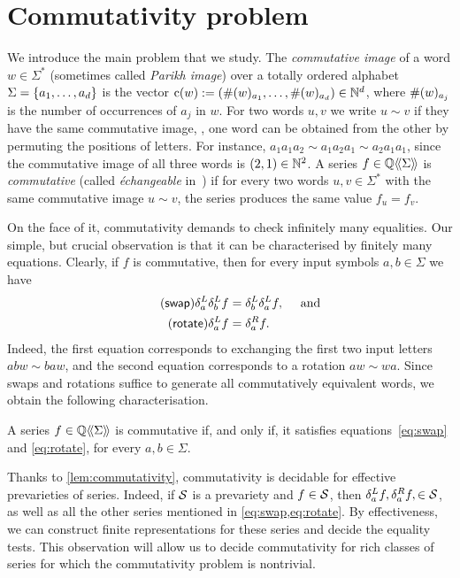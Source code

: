 \section{Commutativity problem}
\label{sec:commutativity}

We introduce the main problem that we study.
%
The \emph{commutative image} of a word $w \in \Sigma^*$ (sometimes called \emph{Parikh image})
over a totally ordered alphabet $\Sigma = \set{a_1, \dots, a_d}$
is the vector $\Parikh w := \tuple{\multiplicity {a_1} w, \dots, \multiplicity {a_d} w} \in \N^d$,
where $\multiplicity {a_j} w$ is the number of occurrences of $a_j$ in $w$.
%
For two words $u, v$ we write $u \sim v$ if they have the same commutative image,
\ie, one word can be obtained from the other by permuting the positions of letters.
%
For instance, $a_1a_1a_2 \sim a_1a_2a_1 \sim a_2a_1a_1$,
since the commutative image of all three words is $\tuple{2, 1} \in \N^2$.
%
A series $f \in \series \Q \Sigma$ is \emph{commutative} 
(called \emph{échangeable} in~\cite{Fliess:1981})
if for every two words $u, v \in \Sigma^*$ with the same commutative image $u \sim v$,
the series produces the same value $f_u = f_v$.

On the face of it, commutativity demands to check infinitely many equalities.
%
Our simple, but crucial observation is that it can be characterised by finitely many equations.
%
Clearly, if $f$ is commutative, then for every input symbols $a, b \in \Sigma$ we have
%
\begin{align}
    \label{eq:swap}
    \tag{\textsf{swap}}
    \deriveleft a \deriveleft b f &= \deriveleft b \deriveleft a f, \quad \text{ and } \\
    \label{eq:rotate}
    \tag{\textsf{rotate}}
    \deriveleft a f &= \deriveright a f.
\end{align}
%
Indeed, the first equation corresponds to exchanging the first two input letters $abw \sim baw$,
and the second equation corresponds to a rotation $aw \sim wa$.
%
Since swaps and rotations suffice to generate all commutatively equivalent words,
we obtain the following characterisation.
%
\begin{lemma}
    \label{lem:commutativity}
    A series $f \in \series \Q \Sigma$ is commutative if, and only if,
    it satisfies equations~\cref{eq:swap} and \cref{eq:rotate},
    for every $a, b \in \Sigma$.
\end{lemma}
%
\noindent
Thanks to \cref{lem:commutativity},
commutativity is decidable for effective prevarieties of series.
%
Indeed, if $\SS$ is a prevariety and $f \in \SS$,
then $\deriveleft a f, \deriveright a f, \in \SS$,
as well as all the other series mentioned in \cref{eq:swap,eq:rotate}.
%
By effectiveness, we can construct finite representations for these series and decide the equality tests.
%
This observation will allow us to decide commutativity for rich classes of series
for which the commutativity problem is nontrivial.
%
\thmCommutativityForPrevarieties*


